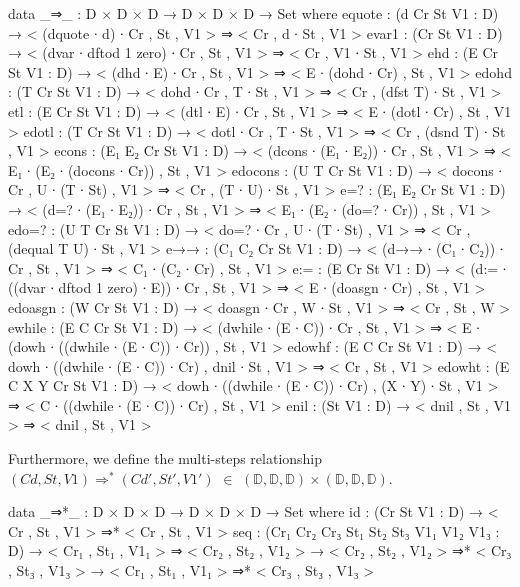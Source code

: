\documentclass{jfrarticle}
\begin{document}
\begin{code}[fontsize=\scriptsize]
data _⇒_ : D × D × D → D × D × D → Set where
  equote  : (d Cr St V1 : D)
            → < (dquote ∙ d) ∙ Cr , St , V1 >
            ⇒ < Cr , d ∙ St , V1 >
  evar1   : (Cr St V1 : D)
            → < (dvar ∙ dftod {1} zero) ∙ Cr , St , V1 >
            ⇒ < Cr , V1 ∙ St , V1 >
  ehd     : (E Cr St V1 : D)
            → < (dhd ∙ E) ∙ Cr , St , V1 >
            ⇒ < E ∙ (dohd ∙ Cr) , St , V1 >
  edohd   : (T Cr St V1 : D)
            → < dohd ∙ Cr , T ∙ St , V1 >
            ⇒ < Cr , (dfst T) ∙ St , V1 >
  etl     : (E Cr St V1 : D)
            → < (dtl ∙ E) ∙ Cr , St , V1 >
            ⇒ < E ∙ (dotl ∙ Cr) , St , V1 >
  edotl   : (T Cr St V1 : D)
            → < dotl ∙ Cr , T ∙ St , V1 >
            ⇒ < Cr , (dsnd T) ∙ St , V1 >
  econs   : (E₁ E₂ Cr St V1 : D)
            → < (dcons ∙ (E₁ ∙ E₂)) ∙ Cr , St , V1 >
            ⇒ < E₁ ∙ (E₂ ∙ (docons ∙ Cr)) , St , V1 >
  edocons : (U T Cr St V1 : D)
            → < docons ∙ Cr , U ∙ (T ∙ St) , V1 >
            ⇒ < Cr , (T ∙ U) ∙ St , V1 >
  e=?     : (E₁ E₂ Cr St V1 : D)
            → < (d=? ∙ (E₁ ∙ E₂)) ∙ Cr , St , V1 >
            ⇒ < E₁ ∙ (E₂ ∙ (do=? ∙ Cr)) , St , V1 >
  edo=?   : (U T Cr St V1 : D)
            → < do=? ∙ Cr , U ∙ (T ∙ St) , V1 >
            ⇒ < Cr , (dequal T U) ∙ St , V1 >
  e→→     : (C₁ C₂ Cr St V1 : D)
            → < (d→→ ∙ (C₁ ∙ C₂)) ∙ Cr , St , V1 >
            ⇒ < C₁ ∙ (C₂ ∙ Cr) , St , V1 >
  e:=     : (E Cr St V1 : D)
            → < (d:= ∙ ((dvar ∙ dftod {1} zero) ∙ E)) ∙ Cr , St , V1 >
            ⇒ < E ∙ (doasgn ∙ Cr) , St , V1 >
  edoasgn : (W Cr St V1 : D)
            → < doasgn ∙ Cr , W ∙ St , V1 >
            ⇒ < Cr , St , W >
  ewhile  : (E C Cr St V1 : D)
            → < (dwhile ∙ (E ∙ C)) ∙ Cr , St , V1 >
            ⇒ < E ∙ (dowh ∙ ((dwhile ∙ (E ∙ C)) ∙ Cr)) , St , V1 >
  edowhf  : (E C Cr St V1 : D)
            → < dowh ∙ ((dwhile ∙ (E ∙ C)) ∙ Cr) , dnil ∙ St , V1 >
            ⇒ < Cr , St , V1 >
  edowht  : (E C X Y Cr St V1 : D)
            → < dowh ∙ ((dwhile ∙ (E ∙ C)) ∙ Cr) , (X ∙ Y) ∙ St , V1 >
            ⇒ <  C ∙ ((dwhile ∙ (E ∙ C)) ∙ Cr)  , St , V1 >
  enil    : (St V1 : D) → < dnil , St , V1 > ⇒ < dnil , St , V1 >
\end{code}
Furthermore, we define the multi-steps relationship $(Cd,St,V1)\Rightarrow^*(Cd',St',V1')$ $\in$  $(\mathds{D},\mathds{D},\mathds{D})\times (\mathds{D},\mathds{D},\mathds{D})$.
\begin{code}[fontsize=\small]
data _⇒*_ : D × D × D → D × D × D → Set where
  id   : (Cr St V1 : D) → < Cr , St , V1 > ⇒* < Cr , St , V1 >
  seq  : (Cr₁ Cr₂ Cr₃ St₁ St₂ St₃ V1₁ V1₂ V1₃ : D)
         → < Cr₁ , St₁ , V1₁ > ⇒  < Cr₂ , St₂ , V1₂ >
         → < Cr₂ , St₂ , V1₂ > ⇒* < Cr₃ , St₃ , V1₃ >
         → < Cr₁ , St₁ , V1₁ > ⇒* < Cr₃ , St₃ , V1₃ >
\end{code}
\end{document}

